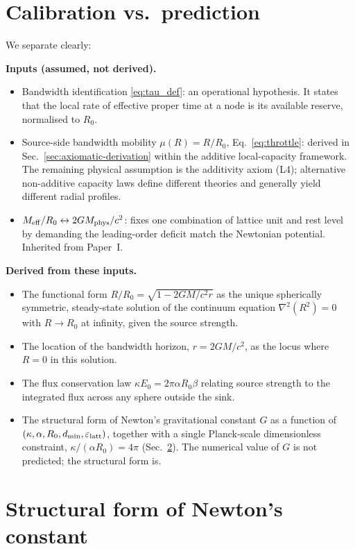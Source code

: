 \documentclass[11pt,a4paper]{article}
\begin{document}
\section{Calibration vs.\ prediction}
\label{sec:cal-vs-pred}

We separate clearly:

\textbf{Inputs (assumed, not derived).}
\begin{itemize}
\item Bandwidth identification \eqref{eq:tau_def}: an
operational hypothesis. It states that the local rate of
effective proper time at a node is its available reserve,
normalised to $R_0$.
\item Source-side bandwidth mobility $\mu(R) = R/R_0$,
Eq.~\eqref{eq:throttle}: derived in Sec.~\ref{sec:axiomatic-derivation}
within the additive local-capacity framework. The remaining
physical assumption is the additivity axiom (L4); alternative
non-additive capacity laws define different theories and
generally yield different radial profiles.
\item $M_{\rm eff} / R_0 \leftrightarrow 2 G M_{\rm phys} / c^2$:
fixes one combination of lattice unit and rest level by
demanding the leading-order deficit match the Newtonian
potential. Inherited from Paper~I.
\end{itemize}

\textbf{Derived from these inputs.}
\begin{itemize}
\item The functional form $R/R_0 = \sqrt{1 - 2GM/c^2 r}$ as
the unique spherically symmetric, steady-state solution of the
continuum equation $\nabla^2(R^2) = 0$ with $R \to R_0$ at
infinity, given the source strength.
\item The location of the bandwidth horizon, $r = 2GM/c^2$,
as the locus where $R = 0$ in this solution.
\item The flux conservation law $\kappa E_0 = 2 \pi \alpha
R_0 \beta$ relating source strength to the integrated flux
across any sphere outside the sink.
\item The structural form of Newton's gravitational constant
$G$ as a function of $(\kappa, \alpha, R_0, d_{\min},
\varepsilon_{\rm latt})$, together with a single Planck-scale
dimensionless constraint, $\kappa/(\alpha R_0) = 4\pi$
(Sec.~\ref{sec:newton-G}). The numerical value of $G$ is not
predicted; the structural form is.
\end{itemize}

\section{Structural form of Newton's constant}
\label{sec:newton-G}
\end{document}
